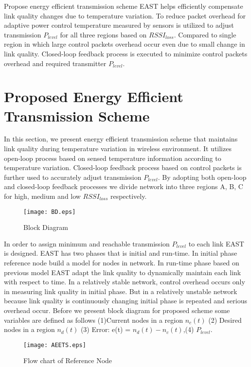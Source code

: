 \documentclass[12pt, conference, compsocconf, onecolumn, draftcls]{IEEEtran}
\begin{document}
Propose energy efficient transmission scheme EAST helps efficiently compensate link quality changes due to temperature variation. To reduce packet overhead for adaptive power control temperature measured by sensors is utilized to adjust transmission $P_{level}$ for all  three regions based on $RSSI_{loss}$. Compared to single region in which large control packets overhead occur even due to small change in link quality. Closed-loop feedback process is executed to minimize control packets overhead and required transmitter $P_{level}$.

\section{Proposed Energy Efficient Transmission Scheme}

In this section, we present energy efficient transmission scheme that maintains link quality during temperature variation in wireless environment. It utilizes open-loop process based on sensed temperature information according to temperature variation. Closed-loop feedback process based on control packets is further used to accurately adjust transmission $P_{level}$. By adopting both open-loop and closed-loop feedback processes we divide network into three regions A, B, C for high, medium and low $RSSI_{loss}$ respectively.

\begin{figure}[h]
\begin{center}
\texttt{[image: BD.eps]}
\caption{Block Diagram}
\end{center}
\end{figure}

In order to assign minimum and reachable transmission $P_{level}$ to each link EAST is designed. EAST has two phases that is initial and run-time. In initial phase reference node build a model for nodes in network. In run-time phase based on previous model EAST adapt the link quality to dynamically maintain each link with respect to time. In a relatively stable network, control overhead occurs only in measuring link quality in initial phase. But in a relatively unstable network because link quality is continuously changing initial phase is repeated and serious overhead occur. Before we present block diagram for proposed scheme some variables are defined as follows (1)Current nodes in a region $n_{c}(t)$ (2) Desired nodes in a region $n_{d}(t)$ (3) Error: e(t) = $n_{d}(t) - n_{c}(t)$,(4) $P_{level}$.


\begin{figure*}[t]
\begin{center}
\texttt{[image: AEETS.eps]}
\caption{Flow chart of Reference Node}
\end{center}
\end{figure*}
\end{document}
